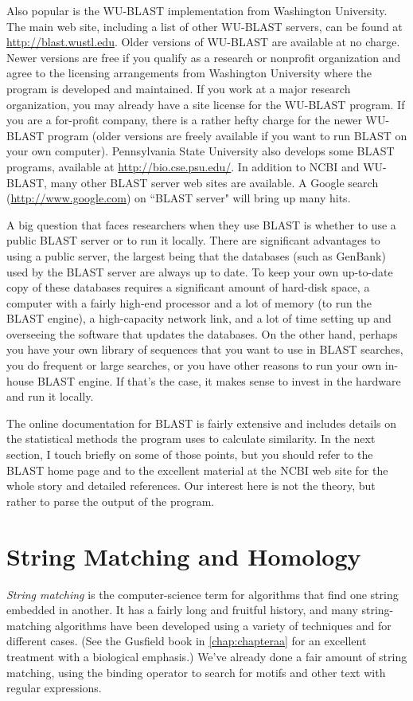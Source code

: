 Also popular is the WU-BLAST implementation from Washington University. The main web site, including a list of other WU-BLAST servers, can be found at \href{http://blast.wustl.edu}{http://blast.wustl.edu}. Older versions of WU-BLAST are available at no charge. Newer versions are free if you qualify as a research or nonprofit organization and agree to the licensing arrangements from Washington University where the program is developed and maintained. If you work at a major research organization, you may already have a site license for the WU-BLAST program. If you are a for-profit company, there is a rather hefty charge for the newer WU-BLAST program (older versions are freely available if you want to run BLAST on your own computer). Pennsylvania State University also develops some BLAST programs, available at \href{http://bio.cse.psu.edu/}{http://bio.cse.psu.edu/}. In addition to NCBI and WU-BLAST, many other BLAST server web sites are available. A Google search (\href{http://www.google.com}{http://www.google.com}) on ``BLAST server" will bring up many hits.

A big question that faces researchers when they use BLAST is whether to use a public BLAST server or to run it locally. There are significant advantages to using a public server, the largest being that the databases (such as GenBank) used by the BLAST server are always up to date. To keep your own up-to-date copy of these databases requires a significant amount of hard-disk space, a computer with a fairly high-end processor and a lot of memory (to run the BLAST engine), a high-capacity network link, and a lot of time setting up and overseeing the software that updates the databases. On the other hand, perhaps you have your own library of sequences that you want to use in BLAST searches, you do frequent or large searches, or you have other reasons to run your own in-house BLAST engine. If that's the case, it makes sense to invest in the hardware and run it locally.

The online documentation for BLAST is fairly extensive and includes details on the statistical methods the program uses to calculate similarity. In the next section, I touch briefly on some of those points, but you should refer to the BLAST home page and to the excellent material at the NCBI web site for the whole story and detailed references. Our interest here is not the theory, but rather to parse the output of the program.

\section{String Matching and Homology}
\textit{String matching} is the computer-science term for algorithms that find one string embedded in another. It has a fairly long and fruitful history, and many string-matching algorithms have been developed using a variety of techniques and for different cases. (See the Gusfield book in \autoref{chap:chapteraa} for an excellent treatment with a biological emphasis.) We've already done a fair amount of string matching, using the binding operator to search for motifs and other text with regular expressions.


